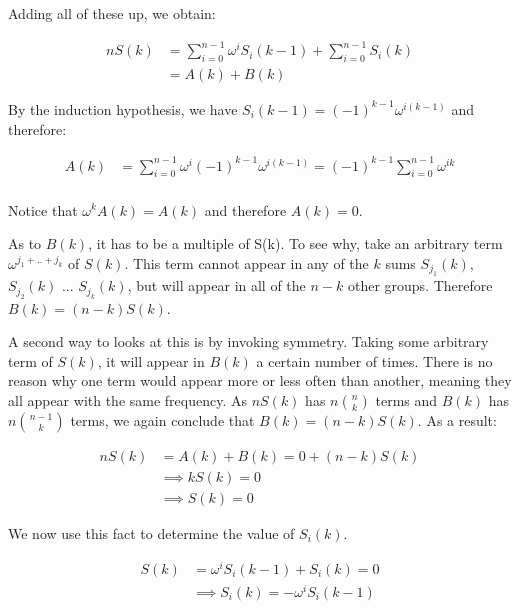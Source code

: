 \documentclass[a4paper]{article}
\begin{document}
Adding all of these up, we obtain:

\begin{equation}
  \begin{aligned}
    nS(k) &= \sum_{i=0}^{n-1} \omega^iS_i(k-1) + \sum_{i=0}^{n-1} S_i(k) \\
          &= A(k) + B(k)
  \end{aligned}
\end{equation}

By the induction hypothesis, we have $S_i(k-1) = (-1)^{k-1} \omega^{i(k-1)}$ and therefore:

\begin{equation}
  \begin{aligned}
    A(k) &= \sum_{i=0}^{n-1} \omega^i (-1)^{k-1} \omega^{i(k-1)} = (-1)^{k-1} \sum_{i=0}^{n-1} \omega^{ik}\\
  \end{aligned}
\end{equation}

Notice that $\omega^k A(k) = A(k)$ and therefore $A(k) = 0$.

As to $B(k)$, it has to be a multiple of S(k). To see why, take an arbitrary term $\omega^{j_1 + .. + j_k}$ of $S(k)$. This term cannot appear in any of the $k$ sums $S_{j_1}(k)$, $S_{j_2}(k)$ ... $S_{j_k}(k)$, but will appear in all of the $n-k$ other groups. Therefore $B(k) = (n-k)S(k)$.

A second way to looks at this is by invoking symmetry. Taking some arbitrary term of $S(k)$, it will appear in $B(k)$ a certain number of times. There is no reason why one term would appear more or less often than another, meaning they all appear with the same frequency. As $nS(k)$ has $n\binom{n}{k}$ terms and $B(k)$ has $n\binom{n-1}{k}$ terms, we again conclude that $B(k) = (n-k)S(k)$. As a result: 

\begin{equation}
  \begin{aligned}
    nS(k) &= A(k) + B(k) = 0 + (n-k)S(k) \\
    &\implies kS(k) = 0 \\
    &\implies S(k) = 0
  \end{aligned}
\end{equation}

We now use this fact to determine the value of $S_i(k)$.

\begin{equation}
  \begin{aligned}
    S(k) &= \omega^i S_i(k-1) + S_i(k) = 0\\
    &\implies S_i(k) = - \omega^i S_i(k-1) \\
  \end{aligned}
\end{equation}
\end{document}
